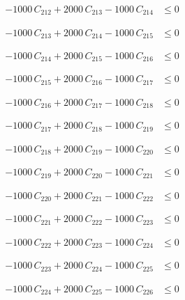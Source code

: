 \documentclass[a4paper,11pt]{article}
\begin{document}
\begin{align}
-1000\,C_{212} + 2000\,C_{213} - 1000\,C_{214} &\leq 0 \nonumber
\end{align}

\begin{align}
-1000\,C_{213} + 2000\,C_{214} - 1000\,C_{215} &\leq 0 \nonumber
\end{align}

\begin{align}
-1000\,C_{214} + 2000\,C_{215} - 1000\,C_{216} &\leq 0 \nonumber
\end{align}

\begin{align}
-1000\,C_{215} + 2000\,C_{216} - 1000\,C_{217} &\leq 0 \nonumber
\end{align}

\begin{align}
-1000\,C_{216} + 2000\,C_{217} - 1000\,C_{218} &\leq 0 \nonumber
\end{align}

\begin{align}
-1000\,C_{217} + 2000\,C_{218} - 1000\,C_{219} &\leq 0 \nonumber
\end{align}

\begin{align}
-1000\,C_{218} + 2000\,C_{219} - 1000\,C_{220} &\leq 0 \nonumber
\end{align}

\begin{align}
-1000\,C_{219} + 2000\,C_{220} - 1000\,C_{221} &\leq 0 \nonumber
\end{align}

\begin{align}
-1000\,C_{220} + 2000\,C_{221} - 1000\,C_{222} &\leq 0 \nonumber
\end{align}

\begin{align}
-1000\,C_{221} + 2000\,C_{222} - 1000\,C_{223} &\leq 0 \nonumber
\end{align}

\begin{align}
-1000\,C_{222} + 2000\,C_{223} - 1000\,C_{224} &\leq 0 \nonumber
\end{align}

\begin{align}
-1000\,C_{223} + 2000\,C_{224} - 1000\,C_{225} &\leq 0 \nonumber
\end{align}

\begin{align}
-1000\,C_{224} + 2000\,C_{225} - 1000\,C_{226} &\leq 0 \nonumber
\end{align}
\end{document}
